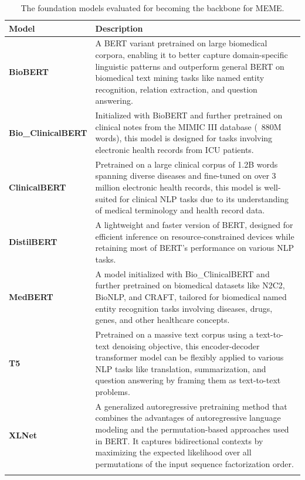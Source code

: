 \documentclass[pmlr]{jmlr}%
\begin{document}
{\begin{table}[H]
\caption{The foundation models evaluated for becoming the backbone for MEME.}
\begin{tabular}{p{6cm}p{8cm}}
\toprule
\textbf{Model} & \textbf{Description} \\
\midrule
\textbf{BioBERT} \citep{lee2020biobert} & A BERT variant pretrained on large biomedical corpora, enabling it to better capture domain-specific linguistic patterns and outperform general BERT on biomedical text mining tasks like named entity recognition, relation extraction, and question answering.\\
\midrule
\textbf{Bio\_ClinicalBERT} \citep{alsentzer2019publicly} & Initialized with BioBERT and further pretrained on clinical notes from the MIMIC III database (~880M words), this model is designed for tasks involving electronic health records from ICU patients.\\
\midrule
\textbf{ClinicalBERT} \citep{huang2019clinicalbert} & Pretrained on a large clinical corpus of 1.2B words spanning diverse diseases and fine-tuned on over 3 million electronic health records, this model is well-suited for clinical NLP tasks due to its understanding of medical terminology and health record data.\\
\midrule
\textbf{DistilBERT} \citep{sanh2019distilbert} & A lightweight and faster version of BERT, designed for efficient inference on resource-constrained devices while retaining most of BERT's performance on various NLP tasks.\\
\midrule
\textbf{MedBERT} \citep{9980157} & A model initialized with Bio\_ClinicalBERT and further pretrained on biomedical datasets like N2C2, BioNLP, and CRAFT, tailored for biomedical named entity recognition tasks involving diseases, drugs, genes, and other healthcare concepts.\\
\midrule
\textbf{T5} \citep{2020t5} & Pretrained on a massive text corpus using a text-to-text denoising objective, this encoder-decoder transformer model can be flexibly applied to various NLP tasks like translation, summarization, and question answering by framing them as text-to-text problems.\\
\midrule
\textbf{XLNet} \citep{yang2019xlnet} & A generalized autoregressive pretraining method that combines the advantages of autoregressive language modeling and the permutation-based approaches used in BERT. It captures bidirectional contexts by maximizing the expected likelihood over all permutations of the input sequence factorization order.\\
\bottomrule
\label{TableModel}
\end{tabular}
\end{table}

}
\end{document}
